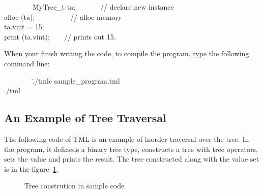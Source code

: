 \documentclass[12pt,psfig,a4]{article}
\begin{document}
\begin{code}
\begin{tabbing}
~~~~~~~~\=MyTree\_t ta;~~~~~~~// declare new instance\\
\> alloc (ta);~~~~~~~~~~// alloc memory\\
\> ta.vint = 15;\\
\> print (ta.vint);~~~~// prints out 15.\\
\end{tabbing}
\end{code}

When your finish writing the code, to compile the program, type the following command line:
\begin{code}
\begin{tabbing}
~~~~~~~~\=./tmlc sample\_program.tml\\
\> ./tml\\
\end{tabbing}
\end{code}

\subsection {An Example of Tree Traversal}
The following code of TML is an example of inorder traversal over the tree. In the program, it defineds a binary tree type, constructs a tree with tree operators, sets the value and prints the result.
The tree constructed along with the value set is in the figure~\ref{bintree}.

\begin{figure}[h!]
{\centering {} \par}
\caption{Tree constrution in sample code}
\label{bintree}
\end{figure}
\end{document}
